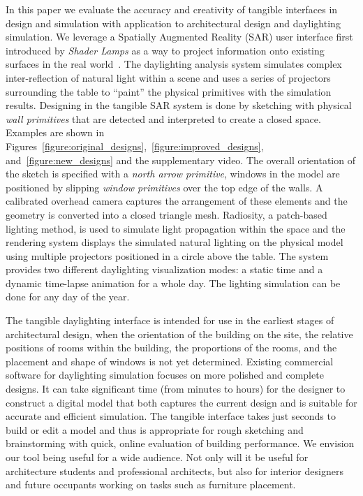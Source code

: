 \documentclass{article}
\begin{document}
In this paper we evaluate the accuracy and creativity of tangible
interfaces in design and simulation with application to architectural
design and daylighting simulation.  We leverage a Spatially Augmented
Reality (SAR) user interface first introduced by \emph{Shader Lamps}
as a way to project information onto existing surfaces in the real
world~\cite{Raskar:2001:SLA}.  The daylighting analysis system
simulates complex inter-reflection of natural light within a scene and
uses a series of projectors surrounding the table to ``paint'' the
physical primitives with the simulation results.  Designing in the
tangible SAR system is done by sketching with physical \emph{wall
  primitives} that are detected and interpreted to create a closed
space.  Examples are shown in
Figures~\ref{figure:original_designs},~\ref{figure:improved_designs},
and~\ref{figure:new_designs} and the supplementary video.  The overall
orientation of the sketch is specified with a \emph{north arrow
  primitive}, windows in the model are positioned by slipping
\emph{window primitives} over the top edge of the walls.
%
A calibrated overhead camera captures the arrangement of these
elements and the geometry is converted into a closed triangle mesh.
Radiosity, a patch-based lighting method, is used to simulate light
propagation within the space and the rendering system displays the
simulated natural lighting on the physical model using multiple
projectors positioned in a circle above the table.  The system
provides two different daylighting visualization modes: a static time
and a dynamic time-lapse animation for a whole day.  The lighting
simulation can be done for any day of the year.

The tangible daylighting interface is intended for use in the earliest
stages of architectural design, when the orientation of the building
on the site, the relative positions of rooms within the building, the
proportions of the rooms, and the placement and shape of windows is
not yet determined.  Existing commercial software for daylighting
simulation focuses on more polished and complete designs.  It can take
significant time (from minutes to hours) for the designer to construct
a digital model that both captures the current design and is suitable
for accurate and efficient simulation.  The tangible interface takes
just seconds to build or edit a model and thus is appropriate for
rough sketching and brainstorming with quick, online evaluation of
building performance.  We envision our tool being useful for a wide
audience.  Not only will it be useful for architecture students and
professional architects, but also for interior designers and future
occupants working on tasks such as furniture placement.
\end{document}
